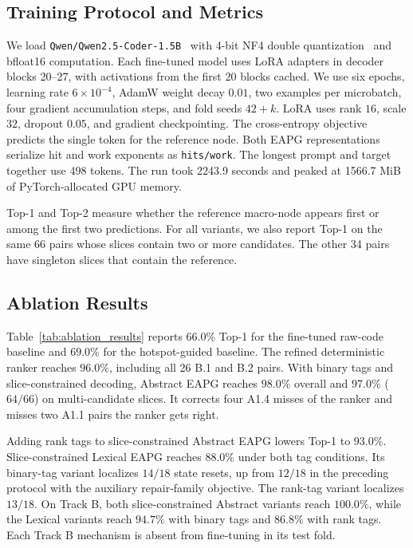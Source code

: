 \subsection{Training Protocol and Metrics}
We load \texttt{Qwen/Qwen2.5-Coder-1.5B}~\cite{hui2024qwen25coder} with 4-bit NF4 double quantization~\cite{dettmers2023qlora} and bfloat16 computation. Each fine-tuned model uses LoRA adapters in decoder blocks 20--27, with activations from the first 20 blocks cached. We use six epochs, learning rate $6\times 10^{-4}$, AdamW weight decay $0.01$, two examples per microbatch, four gradient accumulation steps, and fold seeds $42+k$. LoRA uses rank $16$, scale $32$, dropout $0.05$, and gradient checkpointing. The cross-entropy objective predicts the single token for the reference node. Both EAPG representations serialize hit and work exponents as \texttt{hits/work}. The longest prompt and target together use 498 tokens. The run took 2243.9 seconds and peaked at 1566.7 MiB of PyTorch-allocated GPU memory.

Top-1 and Top-2 measure whether the reference macro-node appears first or among the first two predictions. For all variants, we also report Top-1 on the same 66 pairs whose slices contain two or more candidates. The other 34 pairs have singleton slices that contain the reference.



\subsection{Ablation Results}
Table~\ref{tab:ablation_results} reports $66.0\%$ Top-1 for the fine-tuned raw-code baseline and $69.0\%$ for the hotspot-guided baseline. The refined deterministic ranker reaches $96.0\%$, including all 26 B.1 and B.2 pairs. With binary tags and slice-constrained decoding, Abstract EAPG reaches $98.0\%$ overall and $97.0\%$ ($64/66$) on multi-candidate slices. It corrects four A1.4 misses of the ranker and misses two A1.1 pairs the ranker gets right.

Adding rank tags to slice-constrained Abstract EAPG lowers Top-1 to $93.0\%$. Slice-constrained Lexical EAPG reaches $88.0\%$ under both tag conditions. Its binary-tag variant localizes $14/18$ state resets, up from $12/18$ in the preceding protocol with the auxiliary repair-family objective. The rank-tag variant localizes $13/18$. On Track B, both slice-constrained Abstract variants reach $100.0\%$, while the Lexical variants reach $94.7\%$ with binary tags and $86.8\%$ with rank tags. Each Track B mechanism is absent from fine-tuning in its test fold.

